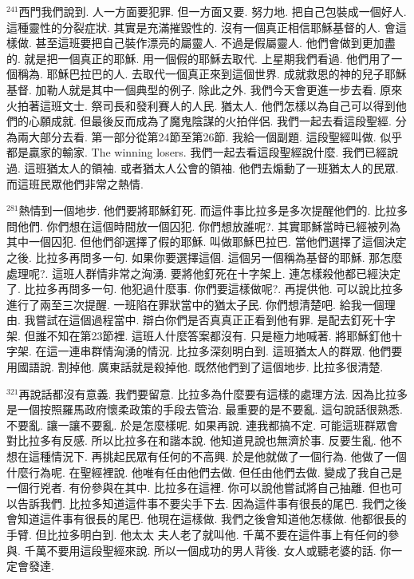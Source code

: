 \documentclass{book}
\begin{document}
$^{241}$西門我們說到.
人一方面要犯罪.
但一方面又要.
努力地.
把自己包裝成一個好人.
這種靈性的分裂症狀.
其實是充滿摧毀性的.
沒有一個真正相信耶穌基督的人.
會這樣做.
甚至這班要把自己裝作漂亮的屬靈人.
不過是假屬靈人.
他們會做到更加盡的.
就是把一個真正的耶穌.
用一個假的耶穌去取代.
上星期我們看過.
他們用了一個稱為.
耶穌巴拉巴的人.
去取代一個真正來到這個世界.
成就救恩的神的兒子耶穌基督.
加勒人就是其中一個典型的例子.
除此之外.
我們今天會更進一步去看.
原來火拍著這班文士.
祭司長和發利賽人的人民.
猶太人.
他們怎樣以為自己可以得到他們的心願成就.
但最後反而成為了魔鬼陰謀的火拍伴侶.
我們一起去看這段聖經.
分為兩大部分去看.
第一部分從第24節至第26節.
我給一個副題.
這段聖經叫做.
似乎都是贏家的輸家.
The winning losers.
我們一起去看這段聖經說什麼.
我們已經說過.
這班猶太人的領袖.
或者猶太人公會的領袖.
他們去煽動了一班猶太人的民眾.
而這班民眾他們非常之熱情.

$^{281}$熱情到一個地步.
他們要將耶穌釘死.
而這件事比拉多是多次提醒他們的.
比拉多問他們.
你們想在這個時間放一個囚犯.
你們想放誰呢?.
其實耶穌當時已經被列為其中一個囚犯.
但他們卻選擇了假的耶穌.
叫做耶穌巴拉巴.
當他們選擇了這個決定之後.
比拉多再問多一句.
如果你要選擇這個.
這個另一個稱為基督的耶穌.
那怎麼處理呢?.
這班人群情非常之洶湧.
要將他釘死在十字架上.
連怎樣殺他都已經決定了.
比拉多再問多一句.
他犯過什麼事.
你們要這樣做呢?.
再提供他.
可以說比拉多進行了兩至三次提醒.
一班陷在罪狀當中的猶太子民.
你們想清楚吧.
給我一個理由.
我嘗試在這個過程當中.
辯白你們是否真真正正看到他有罪.
是配去釘死十字架.
但誰不知在第23節裡.
這班人什麼答案都沒有.
只是極力地喊著.
將耶穌釘他十字架.
在這一連串群情洶湧的情況.
比拉多深刻明白到.
這班猶太人的群眾.
他們要用國語說.
割掉他.
廣東話就是殺掉他.
既然他們到了這個地步.
比拉多很清楚.

$^{321}$再說話都沒有意義.
我們要留意.
比拉多為什麼要有這樣的處理方法.
因為比拉多是一個按照羅馬政府懷柔政策的手段去管治.
最重要的是不要亂.
這句說話很熟悉.
不要亂.
讓一讓不要亂.
於是怎麼樣呢.
如果再說.
連我都搞不定.
可能這班群眾會對比拉多有反感.
所以比拉多在和諧本說.
他知道見說也無濟於事.
反要生亂.
他不想在這種情況下.
再挑起民眾有任何的不高興.
於是他就做了一個行為.
他做了一個什麼行為呢.
在聖經裡說.
他唯有任由他們去做.
但任由他們去做.
變成了我自己是一個行兇者.
有份參與在其中.
比拉多在這裡.
你可以說他嘗試將自己抽離.
但也可以告訴我們.
比拉多知道這件事不要尖手下去.
因為這件事有很長的尾巴.
我們之後會知道這件事有很長的尾巴.
他現在這樣做.
我們之後會知道他怎樣做.
他都很長的手臂.
但比拉多明白到.
他太太 夫人老了就叫他.
千萬不要在這件事上有任何的參與.
千萬不要用這段聖經來說.
所以一個成功的男人背後.
女人或聽老婆的話.
你一定會發達.
\end{document}
